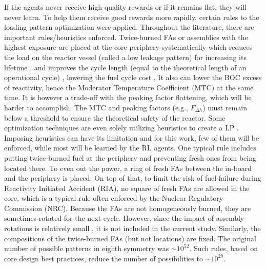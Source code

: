 \documentclass[a4paper]{article}
\begin{document}
If the agents never receive high-quality rewards or if it remains flat, they will never learn. To help them receive good rewards more rapidly, certain rules to the loading pattern optimization were applied. Throughout the literature, there are important rules/heuristics enforced. Twice-burned FAs or assemblies with the highest exposure are placed at the core periphery systematically \cite{kerkar2007exploitation,delcampo2004development,castillo2004bwr} which reduces the load on the reactor vessel (called a low leakage pattern) for increasing its lifetime \cite{kerkar2007exploitation,lin2014themaxmin}, and improves the cycle length (equal to the theoretical length of an operational cycle) \cite{wu2016quantum,lin2014themaxmin}, lowering the fuel cycle cost \cite{kropaczek2011copernicus}. It also can lower the BOC excess of reactivity, hence the Moderator Temperature Coefficient (MTC) \cite{wu2016quantum} at the same time. It is however a trade-off with the peaking factor flattening, which will be harder to accomplish. The MTC and peaking factors (e.g., $F_{\Delta h}$) must remain below a threshold to ensure the theoretical safety of the reactor. Some optimization techniques are even solely utilizing heuristics to create a LP \cite{nissan1997upgrading}. Imposing heuristics can have its limitation and for this work, few of them will be enforced, while most will be learned by the RL agents. One typical rule includes putting twice-burned fuel at the periphery and preventing fresh ones from being located there. To even out the power, a ring of fresh FAs between the in-board and the periphery is placed. On top of that, to limit the risk of fuel failure during Reactivity Initiated Accident (RIA), no square of fresh FAs are allowed in the core, which is a typical rule often enforced by the Nuclear Regulatory Commission (NRC). Because the FAs are not homogeneously burned, they are sometimes rotated for the next cycle. However, since the impact of assembly rotations is relatively small \cite{lin2014themaxmin}, it is not included in the current study. Similarly, the compositions of the twice-burned FAs (but not locations) are fixed. The original number of possible patterns in eighth symmetry was $\sim 10^{52}$.  Such rules, based on core design best practices, reduce the number of possibilities to $\sim 10^{29}$.
\end{document}
